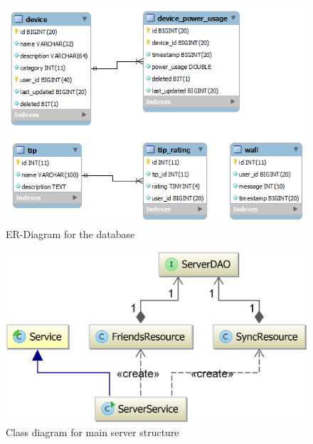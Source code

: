 \begin{figure}[H]
\includegraphics[width=\textwidth]{ch/architecture/fig/ER-Diagram.png}
\caption{ER-Diagram for the database}
\label{fig:ER-Diagram}
\end{figure}

\begin{figure}[H]
\includegraphics[width=\textwidth]{ch/architecture/fig/classDiagramServer.png}
\caption{Class diagram for main server structure}
\label{fig:classDiagramServer}
\end{figure}